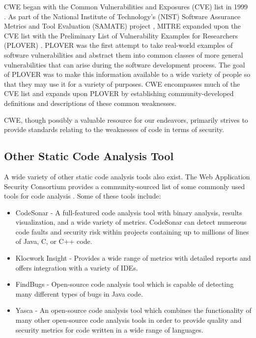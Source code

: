 \documentclass{sig-alternate}
\begin{document}
CWE began with the Common Vulnerabilities and Exposures (CVE) list in 1999 \cite{mitre2005cve}. As part of the National Institute of Technology's (NIST) Software Assurance Metrics and Tool Evaluation (SAMATE) project \cite{nist2005samate}, MITRE expanded upon the CVE list with the Preliminary List of Vulnerability Examples for Researchers (PLOVER) \cite{christey2005plover}. PLOVER was the first attempt to take real-world examples of software vulnerabilities and abstract them into common classes of more general vulnerabilities that can arise during the software development process. The goal of PLOVER was to make this information available to a wide variety of people so that they may use it for a variety of purposes. CWE encompasses much of the CVE list and expands upon PLOVER by establishing community-developed definitions and descriptions of these common weaknesses.

CWE, though possibly a valuable resource for our endeavors, primarily strives to provide standards relating to the weaknesses of code in terms of security.

\subsection{Other Static Code Analysis Tool}
A wide variety of other static code analysis tools also exist. The Web Application Security Consortium provides a community-sourced list of some commonly used tools for code analysis \cite{webappsec2012}. Some of these tools include:

\begin{itemize}
\item CodeSonar - A full-featured code analysis tool with binary analysis, results visualization, and a wide variety of metrics. CodeSonar can detect numerous code faults and security risk within projects containing up to millions of lines of Java, C, or C++ code.
\item Klocwork Insight - Provides a wide range of metrics with detailed reports and offers integration with a variety of IDEs.
\item FindBugs - Open-source code analysis tool which is capable of detecting many different types of bugs in Java code.
\item Yasca - An open-source code analysis tool which combines the functionality of many other open-source code analysis tools in order to provide quality and security metrics for code written in a wide range of languages.
\end{itemize}
\end{document}
